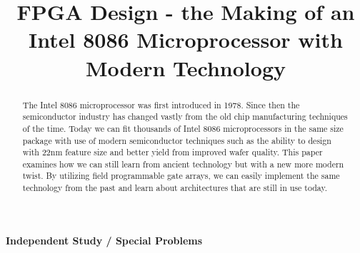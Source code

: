 \documentclass[11pt,peerreview, onecolumn]{IEEEtran}
\begin{document}
\title{FPGA Design - the Making of an Intel 8086 Microprocessor with Modern Technology}

\ifCLASSOPTIONconference
\author{
}
\fi
\maketitle

\ifCLASSOPTIONpeerreview
\begin{center} \bfseries Independent Study / Special Problems \end{center}
\fi
%
\IEEEpeerreviewmaketitle



\begin{abstract}
The Intel 8086 microprocessor was first introduced in 1978. Since then the semiconductor industry has changed vastly from the old chip manufacturing techniques of the time. Today we can fit thousands of Intel 8086 microprocessors in the same size package with use of modern semiconductor techniques such as the ability to design with 22nm feature size and better yield from improved wafer quality. This paper examines how we can still learn from ancient technology but with a new more modern twist. By utilizing field programmable gate arrays, we can easily implement the same technology from the past and learn about architectures that are still in use today.
\end{abstract}

\tableofcontents

\newpage
\end{document}
